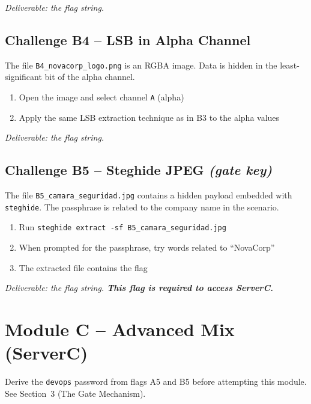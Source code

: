 \documentclass[a4paper, 12pt]{article}
\begin{document}
\textit{Deliverable: the flag string.}

\subsection{Challenge B4 -- LSB in Alpha Channel}

The file \texttt{B4\_novacorp\_logo.png} is an RGBA image.
Data is hidden in the least-significant bit of the alpha channel.

\begin{enumerate}[leftmargin=2em]
  \item Open the image and select channel \texttt{A} (alpha)
  \item Apply the same LSB extraction technique as in B3 to the alpha values
\end{enumerate}

\textit{Deliverable: the flag string.}

\subsection{Challenge B5 -- Steghide JPEG \emph{(gate key)}}

The file \texttt{B5\_camara\_seguridad.jpg} contains a hidden payload embedded
with \texttt{steghide}. The passphrase is related to the company name in the scenario.

\begin{enumerate}[leftmargin=2em]
  \item Run \texttt{steghide extract -sf B5\_camara\_seguridad.jpg}
  \item When prompted for the passphrase, try words related to ``NovaCorp''
  \item The extracted file contains the flag
\end{enumerate}

\textit{Deliverable: the flag string. \textbf{This flag is required to access ServerC.}}

\section{Module C -- Advanced Mix (ServerC)}

\begin{mdframed}[backgroundcolor=labgray, linecolor=labred, linewidth=0.5pt]
Derive the \texttt{devops} password from flags A5 and B5 before attempting
this module. See Section~3 (The Gate Mechanism).
\end{mdframed}
\end{document}
